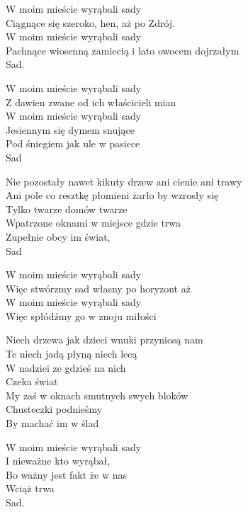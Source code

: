 \begin{text}
    W moim mieście wyrąbali sady\\
    Ciągnące się szeroko, hen, aż po Zdrój.\\
    W moim mieście wyrąbali sady\\
    Pachnące wiosenną zamiecią i lato owocem dojrzałym\\
    Sad.

    W moim mieście wyrąbali sady\\
    Z dawien zwane od ich właścicieli mian\\
    W moim mieście wyrąbali sady\\
    Jesiennym się dymem snujące\\
    Pod śniegiem jak ule w pasiece\\
    Sad

    Nie pozostały nawet kikuty drzew ani cienie ani trawy\\
    Ani pole co resztkę płomieni żarło by wzrosły się\\
    Tylko twarze domów twarze\\
    Wpatrzone oknami w miejsce gdzie trwa\\
    Zupełnie obcy im świat,\\
    Sad

    W moim mieście wyrąbali sady\\
    Więc stwórzmy sad własny po horyzont aż\\
    W moim mieście wyrąbali sady\\
    Więc spłódźmy go w znoju miłości

    Niech drzewa jak dzieci wnuki przyniosą nam\\
    Te niech jadą płyną niech lecą\\
    W nadziei ze gdzieś na nich\\
    Czeka świat\\
    My zaś w oknach smutnych swych bloków\\
    Chusteczki podnieśmy\\
    By machać im w ślad

    W moim mieście wyrąbali sady\\
    I nieważne kto wyrąbał,\\
    Bo ważny jest fakt że w nas\\
    Wciąż trwa\\
    Sad.
\end{text}
\begin{chord}

\end{chord}